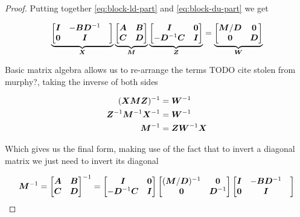\begin{proof}
Putting together \eqref{eq:block-ld-part} and \eqref{eq:block-du-part} we get

\begin{equation}
\underbrace{\begin{bmatrix} {\bm{I}} & -{\bm{B}} {\bm{D}}^{-1} & \\ {\bm{0}} & {\bm{I}} \end{bmatrix}}_{{\bm{X}}}
\underbrace{\begin{bmatrix}{\bm{A}} & {\bm{B}} \\ {\bm{C}} & {\bm{D}} \end{bmatrix}}_{{\bm{M}}}
\underbrace{\begin{bmatrix} {\bm{I}} & {\bm{0}} \\ -{\bm{D}}^{-1} {\bm{C}} & {\bm{I}} \end{bmatrix}}_{{\bm{Z}}} = 
\underbrace{\begin{bmatrix} {\bm{M}}/{\bm{D}} & {\bm{0}} \\ {\bm{0}} & {\bm{D}} \end{bmatrix}}_{{\bm{W}}}
\end{equation}

Basic matrix algebra allows us to re-arrange the terms {TODO cite stolen from murphy?}, taking the inverse of both sides

\begin{align}
({\bm{X}} {\bm{M}} {\bm{Z}})^{-1} &= {\bm{W}}^{-1} \\
{\bm{Z}}^{-1} {\bm{M}}^{-1} {\bm{X}}^{-1} &= {\bm{W}}^{-1} \\
{\bm{M}}^{-1} &= {\bm{Z}} {\bm{W}}^{-1} {\bm{X}}
\end{align}

Which gives us the final form, making use of the fact that to invert a diagonal matrix we just need to invert its diagonal

\begin{equation} \label{eq:block-inverse}
{\bm{M}}^{-1} = \begin{bmatrix} {\bm{A}} & {\bm{B}} \\ {\bm{C}} & {\bm{D}} \end{bmatrix}^{-1} =
\begin{bmatrix} {\bm{I}} & {\bm{0}} \\ -{\bm{D}}^{-1} {\bm{C}} & {\bm{I}} \end{bmatrix}
\begin{bmatrix} ({\bm{M}}/{\bm{D}})^{-1} & {\bm{0}} \\ {\bm{0}} & {\bm{D}}^{-1} \end{bmatrix}
\begin{bmatrix} {\bm{I}} & -{\bm{B}} {\bm{D}}^{-1} & \\ {\bm{0}} & {\bm{I}} \end{bmatrix}
\end{equation}

\end{proof}



